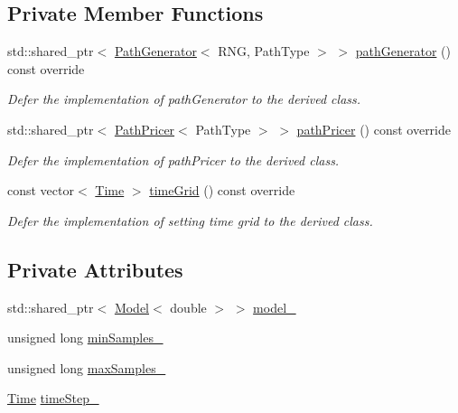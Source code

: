 \subsection*{Private Member Functions}
\begin{DoxyCompactItemize}
\item 
std\+::shared\+\_\+ptr$<$ \hyperlink{class_path_generator}{Path\+Generator}$<$ R\+NG, Path\+Type $>$ $>$ \hyperlink{class_mc_european_engine_ac0f14a7ff770c69ce802eb662230e4cb}{path\+Generator} () const override
\begin{DoxyCompactList}\small\item\em Defer the implementation of path\+Generator to the derived class. \end{DoxyCompactList}\item 
std\+::shared\+\_\+ptr$<$ \hyperlink{class_path_pricer}{Path\+Pricer}$<$ Path\+Type $>$ $>$ \hyperlink{class_mc_european_engine_ad4fb94329470643f2edc491bfcb31bdf}{path\+Pricer} () const override
\begin{DoxyCompactList}\small\item\em Defer the implementation of path\+Pricer to the derived class. \end{DoxyCompactList}\item 
const vector$<$ \hyperlink{_name_def_8h_ac2d3e0ba793497bcca555c7c2cf64ff3}{Time} $>$ \hyperlink{class_mc_european_engine_ae4e0ab6834416144221f1a91dd154587}{time\+Grid} () const override
\begin{DoxyCompactList}\small\item\em Defer the implementation of setting time grid to the derived class. \end{DoxyCompactList}\end{DoxyCompactItemize}
\subsection*{Private Attributes}
\begin{DoxyCompactItemize}
\item 
std\+::shared\+\_\+ptr$<$ \hyperlink{class_model}{Model}$<$ double $>$ $>$ \hyperlink{class_mc_european_engine_a1065e84b2bf625de4ea8d9ed02eb15bf}{model\+\_\+}
\item 
unsigned long \hyperlink{class_mc_european_engine_a3e90a1e87e9096d2cbeebc45b0bb358b}{min\+Samples\+\_\+}
\item 
unsigned long \hyperlink{class_mc_european_engine_a25c0f328428ef5d24fef469e8861cca7}{max\+Samples\+\_\+}
\item 
\hyperlink{_name_def_8h_ac2d3e0ba793497bcca555c7c2cf64ff3}{Time} \hyperlink{class_mc_european_engine_abb61c5565c1f4a1775f04d4d28bd5d21}{time\+Step\+\_\+}
\end{DoxyCompactItemize}
